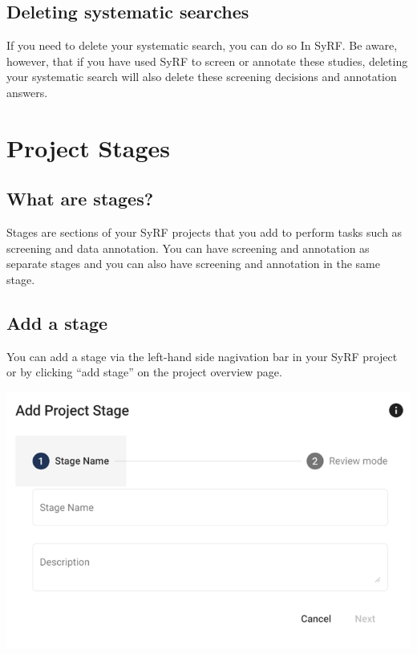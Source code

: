 \documentclass[
]{book}
\begin{document}
\hypertarget{deleting-systematic-searches}{%
\section{Deleting systematic searches}\label{deleting-systematic-searches}}

If you need to delete your systematic search, you can do so In SyRF. Be aware, however, that if you have used SyRF to screen or annotate these studies, deleting your systematic search will also delete these screening decisions and annotation answers.

\hypertarget{projectstages}{%
\chapter{Project Stages}\label{projectstages}}

\hypertarget{what-are-stages}{%
\section{What are stages?}\label{what-are-stages}}

Stages are sections of your SyRF projects that you add to perform tasks such as screening and data annotation. You can have screening and annotation as separate stages and you can also have screening and annotation in the same stage.

\hypertarget{add-a-stage}{%
\section{Add a stage}\label{add-a-stage}}

You can add a stage via the left-hand side nagivation bar in your SyRF project or by clicking ``add stage'' on the project overview page.

\includegraphics[width=1\textwidth,height=1\textheight]{figs/Fig_Add_stage.png}
\end{document}
